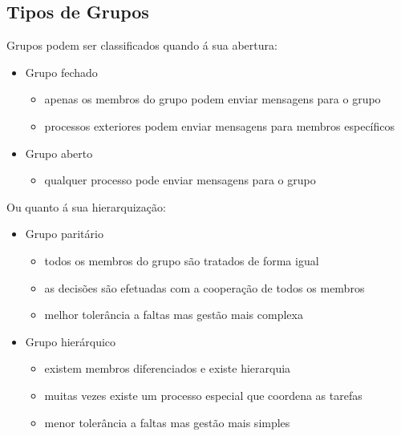 \documentclass[10pt,a4paper]{report}
\begin{document}
\subsection{Tipos de Grupos}
Grupos podem ser classificados quando á sua abertura:
\begin{itemize}
\item Grupo fechado
\begin{itemize}
\item apenas os membros do grupo podem enviar mensagens para o grupo
\item processos exteriores podem enviar mensagens para membros específicos
\end{itemize}
\item Grupo aberto
\begin{itemize}
\item qualquer processo pode enviar mensagens para o grupo
\end{itemize}
\end{itemize}
Ou quanto á sua hierarquização:
\begin{itemize}
\item Grupo paritário
\begin{itemize}
\item todos os membros do grupo são tratados de forma igual
\item as decisões são efetuadas com a cooperação de todos os membros
\item melhor tolerância a faltas mas gestão mais complexa
\end{itemize}
\item Grupo hierárquico
\begin{itemize}
\item existem membros diferenciados e existe hierarquia
\item muitas vezes existe um processo especial que coordena as tarefas
\item menor tolerância a faltas mas gestão mais simples
\end{itemize}
\end{itemize}
\end{document}
